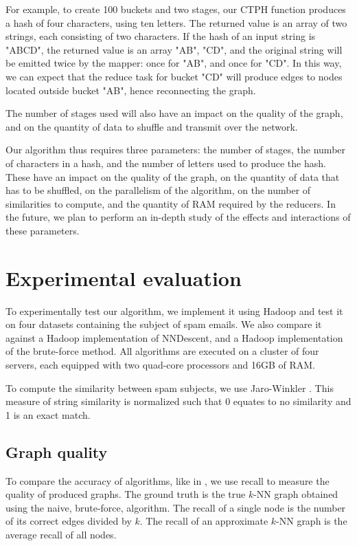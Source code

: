 \documentclass[wcp]{jmlr}
\begin{document}
For example, to create 100 buckets and two stages, our CTPH function produces a hash of four characters, using ten letters. The returned value is an array of two strings, each consisting of two characters. If the hash of an input string is "ABCD", the returned value is an array "AB", "CD", and the original string will be emitted twice by the mapper: once for "AB", and once for "CD". In this way, we can expect that the reduce task for bucket "CD" will produce edges to nodes located outside bucket "AB", hence reconnecting the graph.

The number of stages used will also have an impact on the quality of the graph, and on the quantity of data to shuffle and transmit over the network.

Our algorithm thus requires three parameters: the number of stages, the number of characters in a hash, and the number of letters used to produce the hash. These have an impact on the quality of the graph, on the quantity of data that has to be shuffled, on the parallelism of the algorithm, on the number of similarities to compute, and the quantity of RAM required by the reducers. In the future, we plan to perform an in-depth study of the effects and interactions of these parameters.

\section{Experimental evaluation}

To experimentally test our algorithm, we implement it using Hadoop and test it on four datasets containing the subject of spam emails. We also compare it against a Hadoop implementation of NNDescent, and a Hadoop implementation of the brute-force method. All algorithms are executed on a cluster of four servers, each equipped with two quad-core processors and 16GB of RAM.

To compute the similarity between spam subjects, we use Jaro-Winkler \cite{winkler90}. This measure of string similarity is normalized such that 0 equates to no similarity and 1 is an exact match.

\subsection{Graph quality}

To compare the accuracy of algorithms, like in \cite{Dong2011}, we use recall to measure the quality of produced graphs. The ground truth is the true $k$-NN graph obtained using the naive, brute-force, algorithm. The recall of a single node is the number of its correct edges divided by $k$. The recall of an approximate $k$-NN graph is the average recall of all nodes.
\end{document}
